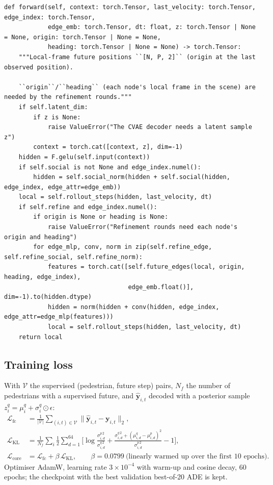\documentclass[10pt]{article}
\begin{document}
\par\smallskip{}\par\nopagebreak
\begin{lstlisting}[aboveskip=2pt]
def forward(self, context: torch.Tensor, last_velocity: torch.Tensor, edge_index: torch.Tensor,
            edge_emb: torch.Tensor, dt: float, z: torch.Tensor | None = None, origin: torch.Tensor | None = None,
            heading: torch.Tensor | None = None) -> torch.Tensor:
    """Local-frame future positions ``[N, P, 2]`` (origin at the last observed position).

    ``origin``/``heading`` (each node's local frame in the scene) are needed by the refinement rounds."""
    if self.latent_dim:
        if z is None:
            raise ValueError("The CVAE decoder needs a latent sample z")
        context = torch.cat([context, z], dim=-1)
    hidden = F.gelu(self.input(context))
    if self.social is not None and edge_index.numel():
        hidden = self.social_norm(hidden + self.social(hidden, edge_index, edge_attr=edge_emb))
    local = self.rollout_steps(hidden, last_velocity, dt)
    if self.refine and edge_index.numel():
        if origin is None or heading is None:
            raise ValueError("Refinement rounds need each node's origin and heading")
        for edge_mlp, conv, norm in zip(self.refine_edge, self.refine_social, self.refine_norm):
            features = torch.cat([self.future_edges(local, origin, heading, edge_index),
                                  edge_emb.float()], dim=-1).to(hidden.dtype)
            hidden = norm(hidden + conv(hidden, edge_index, edge_attr=edge_mlp(features)))
            local = self.rollout_steps(hidden, last_velocity, dt)
    return local
\end{lstlisting}

\subsection{Training loss}
With $\mathcal V$ the supervised (pedestrian, future step) pairs, $N_f$ the number of pedestrians with a
supervised future, and $\hat{\mathbf y}_{i,t}$ decoded with a posterior sample $z^q_i=\mu^q_i+\sigma^q_i\odot\epsilon$:
\begin{align*}
\mathcal L_{\text{fc}} &= \frac{1}{|\mathcal V|}\sum_{(i,t)\in\mathcal V}\big\|\hat{\mathbf y}_{i,t}-\mathbf y_{i,t}\big\|_2,\\
\mathcal L_{\text{KL}} &= \frac{1}{N_f}\sum_i \tfrac12\sum_{d=1}^{64}\Big[\log\tfrac{\sigma^{p\,2}_{i,d}}{\sigma^{q\,2}_{i,d}}+\tfrac{\sigma^{q\,2}_{i,d}+(\mu^q_{i,d}-\mu^p_{i,d})^2}{\sigma^{p\,2}_{i,d}}-1\Big],\\
\mathcal L_{\text{core}} &= \mathcal L_{\text{fc}}+\beta\,\mathcal L_{\text{KL}},\qquad \beta=0.0799\ \text{(linearly warmed up over the first 10 epochs)}.
\end{align*}
Optimiser AdamW, learning rate $3\times10^{-4}$ with warm-up and cosine decay, 60 epochs; the checkpoint with the
best validation best-of-20 ADE is kept.
\end{document}

